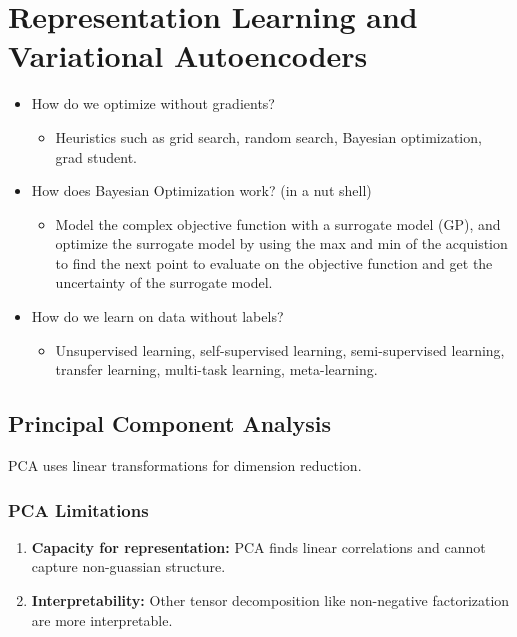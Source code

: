 \documentclass{article}
\begin{document}
\section{Representation Learning and Variational Autoencoders}
\begin{summary}
    \begin{itemize}
        \item How do we optimize without gradients?
        \begin{itemize}
            \item Heuristics such as grid search, random search, Bayesian optimization, grad student.
        \end{itemize}
        \item How does Bayesian Optimization work? (in a nut shell)
        \begin{itemize}
            \item Model the complex objective function with a surrogate model (GP), and optimize the surrogate model by using the max and min of the acquistion to find the next point to evaluate on the objective function and get the uncertainty of the surrogate model.
        \end{itemize}
        \item How do we learn on data without labels?
        \begin{itemize}
            \item Unsupervised learning, self-supervised learning, semi-supervised learning, transfer learning, multi-task learning, meta-learning.
        \end{itemize}
    \end{itemize}
\end{summary}

\subsection{Principal Component Analysis}
\begin{definition}
    PCA uses linear transformations for dimension reduction.
\end{definition}

\subsubsection{PCA Limitations}
\begin{definition}
    \begin{enumerate}
        \item \textbf{Capacity for representation:} PCA finds linear correlations and cannot capture non-guassian structure.
        \item \textbf{Interpretability:} Other tensor decomposition like non-negative factorization are more interpretable.
    \end{enumerate}
\end{definition}
\end{document}
